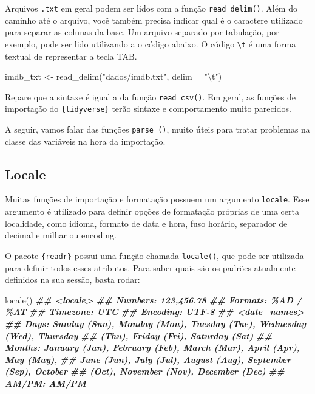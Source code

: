 \documentclass[
]{book}
\newenvironment{Shaded}{\begin{snugshade}}{\end{snugshade}}
\newcommand{\AttributeTok}[1]{\textcolor[rgb]{0.77,0.63,0.00}{#1}}
\newcommand{\DocumentationTok}[1]{\textcolor[rgb]{0.56,0.35,0.01}{\textbf{\textit{#1}}}}
\newcommand{\FunctionTok}[1]{\textcolor[rgb]{0.00,0.00,0.00}{#1}}
\newcommand{\NormalTok}[1]{#1}
\newcommand{\OtherTok}[1]{\textcolor[rgb]{0.56,0.35,0.01}{#1}}
\newcommand{\SpecialCharTok}[1]{\textcolor[rgb]{0.00,0.00,0.00}{#1}}
\newcommand{\StringTok}[1]{\textcolor[rgb]{0.31,0.60,0.02}{#1}}
\begin{document}
Arquivos \texttt{.txt} em geral podem ser lidos com a função \texttt{read\_delim()}. Além do caminho até o arquivo, você também precisa indicar qual é o caractere utilizado para separar as colunas da base. Um arquivo separado por tabulação, por exemplo, pode ser lido utilizando a o código abaixo. O código \texttt{\textbackslash{}t} é uma forma textual de representar a tecla TAB.

\begin{Shaded}
\begin{Highlighting}[]
\NormalTok{imdb\_txt }\OtherTok{\textless{}{-}} \FunctionTok{read\_delim}\NormalTok{(}\StringTok{"dados/imdb.txt"}\NormalTok{, }\AttributeTok{delim =} \StringTok{"}\SpecialCharTok{\textbackslash{}t}\StringTok{"}\NormalTok{)}
\end{Highlighting}
\end{Shaded}

Repare que a sintaxe é igual a da função \texttt{read\_csv()}. Em geral, as funções de importação do \texttt{\{tidyverse\}} terão sintaxe e comportamento muito parecidos.

A seguir, vamos falar das funções \texttt{parse\_()}, muito úteis para tratar problemas na classe das variáveis na hora da importação.

\hypertarget{locale}{%
\subsection{Locale}\label{locale}}

Muitas funções de importação e formatação possuem um argumento \texttt{locale}. Esse argumento é utilizado para definir opções de formatação próprias de uma certa localidade, como idioma, formato de data e hora, fuso horário, separador de decimal e milhar ou encoding.

O pacote \texttt{\{readr\}} possui uma função chamada \texttt{locale()}, que pode ser utilizada para definir todos esses atributos. Para saber quais são os padrões atualmente definidos na sua sessão, basta rodar:

\begin{Shaded}
\begin{Highlighting}[]
\FunctionTok{locale}\NormalTok{()}
\DocumentationTok{\#\# \textless{}locale\textgreater{}}
\DocumentationTok{\#\# Numbers:  123,456.78}
\DocumentationTok{\#\# Formats:  \%AD / \%AT}
\DocumentationTok{\#\# Timezone: UTC}
\DocumentationTok{\#\# Encoding: UTF{-}8}
\DocumentationTok{\#\# \textless{}date\_names\textgreater{}}
\DocumentationTok{\#\# Days:   Sunday (Sun), Monday (Mon), Tuesday (Tue), Wednesday (Wed), Thursday}
\DocumentationTok{\#\#         (Thu), Friday (Fri), Saturday (Sat)}
\DocumentationTok{\#\# Months: January (Jan), February (Feb), March (Mar), April (Apr), May (May),}
\DocumentationTok{\#\#         June (Jun), July (Jul), August (Aug), September (Sep), October}
\DocumentationTok{\#\#         (Oct), November (Nov), December (Dec)}
\DocumentationTok{\#\# AM/PM:  AM/PM}
\end{Highlighting}
\end{Shaded}
\end{document}
